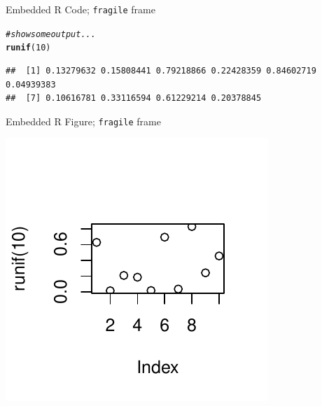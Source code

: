 \documentclass[12pt]{beamer}\usepackage[]{graphicx}\usepackage[]{color}
\makeatletter
\def\maxwidth{ %
  \ifdim\Gin@nat@width>\linewidth
    \linewidth
  \else
    \Gin@nat@width
  \fi
}
\newcommand{\hlnum}[1]{\textcolor[rgb]{0.686,0.059,0.569}{#1}}%
\newcommand{\hlcom}[1]{\textcolor[rgb]{0.678,0.584,0.686}{\textit{#1}}}%
\newcommand{\hlstd}[1]{\textcolor[rgb]{0.345,0.345,0.345}{#1}}%
\newcommand{\hlkwd}[1]{\textcolor[rgb]{0.737,0.353,0.396}{\textbf{#1}}}%
\newenvironment{kframe}{%
 \def\at@end@of@kframe{}%
 \ifinner\ifhmode%
  \def\at@end@of@kframe{\end{minipage}}%
  \begin{minipage}{\columnwidth}%
 \fi\fi%
 \def\FrameCommand##1{\hskip\@totalleftmargin \hskip-\fboxsep
 \colorbox{shadecolor}{##1}\hskip-\fboxsep
     \hskip-\linewidth \hskip-\@totalleftmargin \hskip\columnwidth}%
 \MakeFramed {\advance\hsize-\width
   \@totalleftmargin\z@ \linewidth\hsize
   \@setminipage}}%
 {\par\unskip\endMakeFramed%
 \at@end@of@kframe}
\newenvironment{knitrout}{}{} %
\makeatother
\begin{document}
\begin{frame}[fragile]{Embedded R Code; \texttt{fragile} frame}
\begin{block}

\begin{knitrout}
\color{fgcolor}\begin{kframe}
\begin{alltt}
\hlcom{# show some output...}
\hlkwd{runif}\hlstd{(}\hlnum{10}\hlstd{)}
\end{alltt}
\begin{verbatim}
##  [1] 0.13279632 0.15808441 0.79218866 0.22428359 0.84602719 0.04939383
##  [7] 0.10616781 0.33116594 0.61229214 0.20378845
\end{verbatim}
\end{kframe}
\end{knitrout}

\end{block}
\end{frame}

\begin{frame}[fragile]{Embedded R Figure; \texttt{fragile} frame}

\begin{knitrout}
\color{fgcolor}

{\centering \includegraphics[width=\maxwidth]{figure/unnamed-chunk-2-1} 

}



\end{knitrout}

\end{frame}
\end{document}
